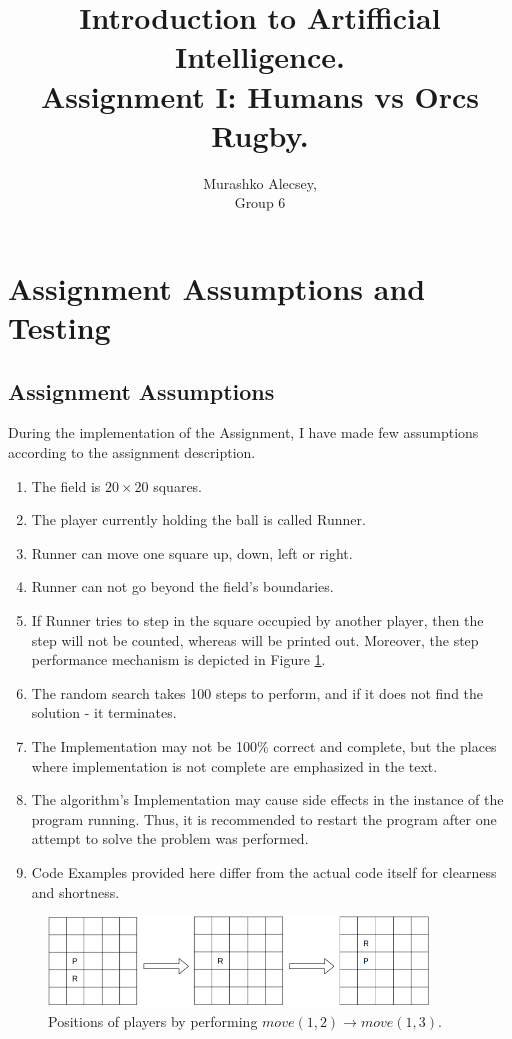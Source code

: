 \documentclass[a4apper,11pt]{article}
\title{Introduction to Artifficial Intelligence.\\ Assignment I: Humans vs Orcs Rugby.}
\author{Murashko Alecsey,\\ Group 6}
\begin{document}
\maketitle
\newpage
\tableofcontents

\newpage
\section{Assignment Assumptions and Testing}
\subsection{Assignment Assumptions}
During the implementation of the Assignment, I have made few assumptions according to the assignment description.
\begin{enumerate}
    \item The field is $20 \times 20$ squares.
    \item The player currently holding the ball is called Runner.
    \item Runner can move one square up, down, left or right.
    \item Runner can not go beyond the field's boundaries.
    \item If Runner tries to step in the square occupied by another player, then the step will not be counted, whereas will be printed out. Moreover, the step performance mechanism is depicted in Figure \ref{pic:stepInPlayer}.
    \item The random search takes 100 steps to perform, and if it does not find the solution - it terminates.
    \item The Implementation may not be 100\% correct and complete, but the places where implementation is not complete are emphasized in the text.
    \item The algorithm's Implementation may cause side effects in the instance of the program running. Thus, it is recommended to restart the program after one attempt to solve the problem was performed.
    \item Code Examples provided here differ from the actual code itself for clearness and shortness.
\end{enumerate}

\begin{figure}[h]
    \centering
    \includegraphics[width=0.9\textwidth]{pic/MoveInSquareWithPlayer.png}
    \caption{Positions of players by performing $move(1,2) \rightarrow move(1,3)$.}
    \label{pic:stepInPlayer}
\end{figure}
\end{document}
